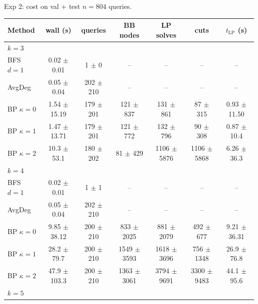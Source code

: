 \documentclass{beamer}
\begin{document}
\begin{frame}{Exp 2: cost on val + test}
  $n = 804$ queries.
  \vfill

  \tiny
  \begin{center}
  \begin{tabular}{lcccccc}
    \toprule
    Method & wall (s) & queries & BB nodes & LP solves & cuts & $t_{\text{LP}}$ (s) \\
    \midrule
    \multicolumn{7}{l}{\textit{$k = 3$}} \\
    BFS $d{=}1$              & 0.02 $\pm$ 0.01  & 1 $\pm$ 0     & --                 & --                  & --                  & --              \\
    AvgDeg                   & 0.05 $\pm$ 0.04  & 202 $\pm$ 210 & --                 & --                  & --                  & --              \\
    BP $\kappa{=}0$          & 1.54 $\pm$ 15.19 & 179 $\pm$ 201 & 121 $\pm$ 837      & 131 $\pm$ 861       & 87 $\pm$ 315        & 0.93 $\pm$ 11.50 \\
    BP $\kappa{=}1$          & 1.47 $\pm$ 13.71 & 179 $\pm$ 201 & 121 $\pm$ 772      & 132 $\pm$ 796       & 90 $\pm$ 308        & 0.87 $\pm$ 10.4 \\
    BP $\kappa{=}2$          & 10.3 $\pm$ 53.1  & 180 $\pm$ 202 & 81 $\pm$ 429       & 1106 $\pm$ 5876     & 1106 $\pm$ 5868     & 6.26 $\pm$ 36.3 \\
    \midrule
    \multicolumn{7}{l}{\textit{$k = 4$}} \\
    BFS $d{=}1$              & 0.02 $\pm$ 0.01  & 1 $\pm$ 1     & --                 & --                  & --                  & --              \\
    AvgDeg                   & 0.05 $\pm$ 0.04  & 202 $\pm$ 210 & --                 & --                  & --                  & --              \\
    BP $\kappa{=}0$          & 9.85 $\pm$ 38.12 & 200 $\pm$ 210 & 833 $\pm$ 2025     & 881 $\pm$ 2079      & 492 $\pm$ 677       & 9.21 $\pm$ 36.31 \\
    BP $\kappa{=}1$          & 28.2 $\pm$ 79.7  & 200 $\pm$ 210 & 1549 $\pm$ 3593    & 1618 $\pm$ 3696     & 756 $\pm$ 1348      & 26.9 $\pm$ 76.8 \\
    BP $\kappa{=}2$          & 47.9 $\pm$ 103.3 & 200 $\pm$ 210 & 1363 $\pm$ 3061    & 3794 $\pm$ 9691     & 3300 $\pm$ 9483     & 44.1 $\pm$ 95.6 \\
    \midrule
    \multicolumn{7}{l}{\textit{$k = 5$}} \\

\end{tabular}
\end{center}
\end{frame}
\end{document}
